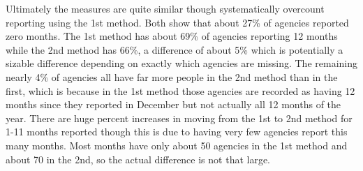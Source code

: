 \documentclass[
]{krantz}
\begin{document}
Ultimately the measures are quite similar though
systematically overcount reporting using the 1st method.
Both show that about 27\% of agencies reported zero months.
The 1st method has about 69\% of agencies reporting 12
months while the 2nd method has 66\%, a difference of about
5\% which is potentially a sizable difference depending on
exactly which agencies are missing. The remaining nearly 4\%
of agencies all have far more people in the 2nd method than
in the first, which is because in the 1st method those
agencies are recorded as having 12 months since they
reported in December but not actually all 12 months of the
year. There are huge percent increases in moving from the
1st to 2nd method for 1-11 months reported though this is
due to having very few agencies report this many months.
Most months have only about 50 agencies in the 1st method
and about 70 in the 2nd, so the actual difference is not
that large.
\end{document}
